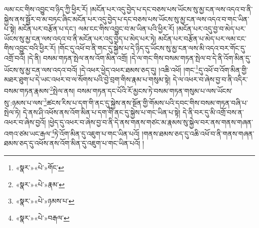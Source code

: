 ལམ་ངང་གིས་འབྱུང་བ་ཉིད་ཀྱི་ཕྱིར་རོ། །མངོན་པར་འདུ་བྱེད་པ་དང་བཅས་པས་ཡོངས་སུ་མྱ་ངན་ལས་འདའ་བ་ནི་སྐྱེས་ནས་སྦྱོར་བ་མ་བཏང་ཞིང་མངོན་པར་འདུ་བྱེད་པ་དང་བཅས་པས་ཡོངས་སུ་མྱ་ངན་ལས་འདའ་བ་གང་ཡིན་པ་སྟེ། མངོན་པར་བརྩོན་པ་དང་། ལམ་ངང་གིས་འབྱུང་བ་མ་ཡིན་པའི་ཕྱིར་རོ། །མངོན་པར་འདུ་བྱ་བ་མེད་པར་ཡོངས་སུ་མྱ་ངན་ལས་འདའ་བ་ནི་མངོན་པར་འདུ་བྱེད་པ་མེད་པར་ཏེ། མངོན་པར་བརྩོན་པ་མེད་པར་ལམ་ངང་གིས་འབྱུང་བའི་ཕྱིར་རོ། །གོང་དུ་འཕོ་བ་ནི་གང་དུ་སྐྱེས་པ་དེ་ཉིད་དུ་ཡོངས་སུ་མྱ་ངན་ལས་མི་འདའ་བར་གོང་དུ་འགྲོ་བའོ། །དེ་ནི། བསམ་གཏན་སྤེལ་ནས་འོག་མིན་འགྲོ། །དེ་ལ་གང་གིས་བསམ་གཏན་སྤེལ་བ་དེ་ནི་འོག་མིན་དུ་ཡོངས་སུ་མྱ་ངན་ལས་འདའ་བའོ། །དེ་འཕར་ཕྱེད་འཕར་ཐམས་ཅད་དུ། །འཆི་འཕོ། །གང་\footnote{«སྣར་»«པེ་»གོང་}དུ་འཕོ་བ་འོག་མིན་གྱི་མཐར་ཐུག་པ་དེ་ཡང་འཕར་བ་ལ་སོགས་པའི་བྱེ་བྲག་གིས་རྣམ་པ་གསུམ་སྟེ། དེ་ལ་འཕར་བ་ཞེས་བྱ་བ་ནི་འདིར་བསམ་གཏན་རྣམས་\footnote{«སྣར་»«པེ་»རྣམ་}སྤེལ་ནས། བསམ་གཏན་དང་པོའི་རོ་མྱངས་ཏེ་བསམ་གཏན་གསུམ་པ་ལས་ཡོངས་སུ་:ཉམས་པ་ལས་\footnote{«སྣར་»«པེ་»ཉམས་པ་}ཚངས་རིས་པ་དག་གི་ནང་དུ་སྐྱེས་ནས་སྔོན་གྱི་གོམས་པའི་དབང་གིས་བསམ་གཏན་བཞི་པ་སྤེལ་ཏེ། དེ་ནས་ཤི་འཕོས་ནས་འོག་མིན་པ་དག་གི་ནང་དུ་སྐྱེས་པ་གང་ཡིན་པ་སྟེ། དེ་ནི་བར་དུ་མི་འགྲོ་བས་ན་འཕར་བ་ཞེས་བྱའོ། །ཕྱེད་དུ་འཕར་བ་ཞེས་བྱ་བ་ནི་དེ་ནས་གནས་གཙང་མ་རྣམས་སུ་སྐྱེལ་བར་ནས་གནས་གཞན་འགའ་ཙམ་ཡང་རྒལ་\footnote{«སྣར་»«པེ་»བརྒལ་}ཏེ་འོག་མིན་དུ་འཇུག་པ་གང་ཡིན་པའོ། །གནས་ཐམས་ཅད་དུ་འཆི་འཕོ་བ་ནི་གནས་གཞན་ཐམས་ཅད་དུ་འཕོས་ནས་འོག་མིན་དུ་འཇུག་པ་གང་ཡིན་པའོ། །
